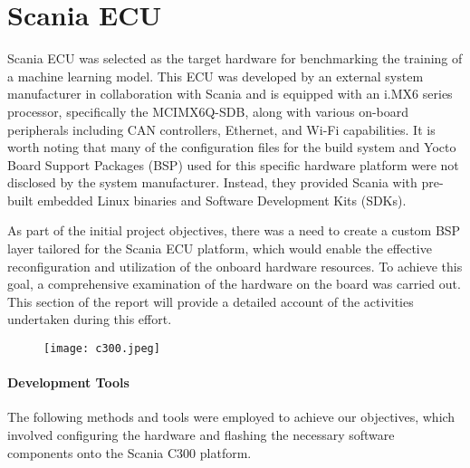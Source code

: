 \chapter{Scania ECU} \label{rtc-c300}


Scania ECU was selected as the target hardware for benchmarking the training of a machine learning model. This ECU was developed by an external system manufacturer in collaboration with Scania and is equipped with an i.MX6 series processor, specifically the MCIMX6Q-SDB, along with various on-board peripherals including CAN controllers, Ethernet, and Wi-Fi capabilities. It is worth noting that many of the configuration files for the build system and Yocto Board Support Packages (BSP) used for this specific hardware platform were not disclosed by the system manufacturer. Instead, they provided Scania with pre-built embedded Linux binaries and Software Development Kits (SDKs).

As part of the initial project objectives, there was a need to create a custom BSP layer tailored for the Scania ECU platform, which would enable the effective reconfiguration and utilization of the onboard hardware resources. To achieve this goal, a comprehensive examination of the hardware on the board was carried out. This section of the report will provide a detailed account of the activities undertaken during this effort.

\begin{figure}[h]
	\centering
	\texttt{[image: c300.jpeg]}
\end{figure}

\subsubsection*{Development Tools}

The following methods and tools were employed to achieve our objectives, which involved configuring the hardware and flashing the necessary software components onto the Scania C300 platform.

